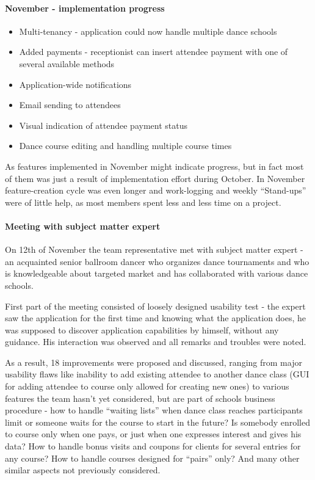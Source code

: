 \documentclass{article}
\begin{document}
\paragraph{November - implementation progress}
\begin{itemize}
\item Multi-tenancy - application could now handle multiple dance schools 
\item Added payments - receptionist can insert attendee payment with one of several available methods
\item Application-wide notifications
\item Email sending to attendees
\item Visual indication of attendee payment status
\item Dance course editing and handling multiple course times
\end{itemize}
As features implemented in November might indicate progress, but in fact most of them was just a result of implementation effort during October. In November feature-creation cycle was even longer and work-logging and weekly ``Stand-ups'' were of little help, as most members spent less and less time on a project.

\paragraph{Meeting with subject matter expert}
On 12th of November the team representative met with subject matter expert - an acquainted senior ballroom dancer who organizes dance tournaments and who is knowledgeable about targeted market and has collaborated with various dance schools. 

First part of the meeting consisted of loosely designed usability test - the expert saw the application for the first time and knowing what the application does, he was supposed to discover application capabilities by himself, without any guidance. His interaction was observed and all remarks and troubles were noted.

As a result, 18 improvements were proposed and discussed, ranging from major usability flaws like inability to add existing attendee to another dance class (GUI for adding attendee to course only allowed for creating new ones) to various features the team hasn't yet considered, but are part of schools business procedure - how to handle ``waiting lists'' when dance class reaches participants limit or someone waits for the course to start in the future? Is somebody enrolled to course only when one pays, or just when one expresses interest and gives his data? How to handle bonus visits and coupons for clients for several entries for any course? How to handle courses designed for ``pairs'' only? And many other similar aspects not previously considered.
\end{document}
